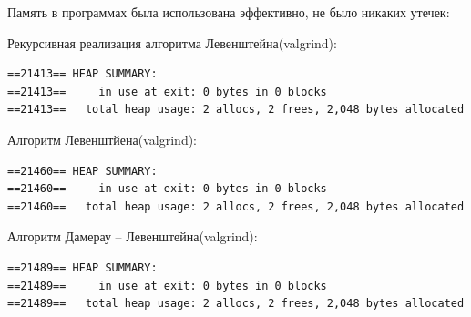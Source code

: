 Память в программах была использована эффективно, не было никаких утечек:

Рекурсивная реализация алгоритма Левенштейна(valgrind):
\begin{lstlisting}
==21413== HEAP SUMMARY:
==21413==     in use at exit: 0 bytes in 0 blocks
==21413==   total heap usage: 2 allocs, 2 frees, 2,048 bytes allocated
\end{lstlisting}

Алгоритм Левенштйена(valgrind):
\begin{lstlisting}
==21460== HEAP SUMMARY:
==21460==     in use at exit: 0 bytes in 0 blocks
==21460==   total heap usage: 2 allocs, 2 frees, 2,048 bytes allocated
\end{lstlisting}

Алгоритм Дамерау -- Левенштейна(valgrind):
\begin{lstlisting}
==21489== HEAP SUMMARY:
==21489==     in use at exit: 0 bytes in 0 blocks
==21489==   total heap usage: 2 allocs, 2 frees, 2,048 bytes allocated
\end{lstlisting}
